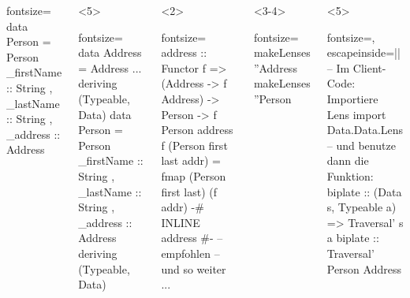 \documentclass{beamer}
\begin{document}
\begin{frame}[fragile,t]
\begin{columns}[t]
\begin{onlyenv}
\begin{haskellcode*}{fontsize=\small}
data Person = Person
  { _firstName :: String
  , _lastName :: String
  , _address :: Address
  }
\end{haskellcode*}
    \end{onlyenv}
    \begin{onlyenv}<5>
\begin{haskellcode*}{fontsize=\small}
data Address = Address {...}
  deriving (Typeable, Data)
data Person = Person
  { _firstName :: String
  , _lastName :: String
  , _address :: Address
  } deriving (Typeable, Data)
\end{haskellcode*}
    \end{onlyenv}
    \begin{onlyenv}<2>
\begin{haskellcode*}{fontsize=\small}
address :: Functor f
        => (Address -> f Address)
        -> Person -> f Person
address f (Person first last addr) =
  fmap (Person first last) (f addr)
{-# INLINE address #-} -- empfohlen
-- und so weiter ...
\end{haskellcode*}
    \end{onlyenv}
    \begin{onlyenv}<3-4>
\begin{haskellcode*}{fontsize=\small}
makeLenses ''Address
makeLenses ''Person
\end{haskellcode*}
    \end{onlyenv}
    \begin{onlyenv}<5>
      \vspace{1em}
\begin{haskellcode*}{fontsize=\footnotesize, escapeinside=||}
-- Im Client-Code: Importiere Lens
import Data.Data.Lens
-- und benutze dann die Funktion:
biplate :: (Data s, Typeable a)
        => Traversal' s a
biplate :: Traversal' Person Address
\end{haskellcode*}
    \end{onlyenv}


\end{columns}
\end{frame}
\end{document}
